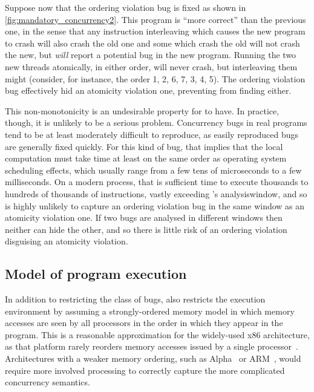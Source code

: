 Suppose now that the ordering violation bug is fixed as shown in
\autoref{fig:mandatory_concurrency2}.  This program is ``more
correct'' than the previous one, in the sense that any instruction
interleaving which causes the new program to crash will also crash the
old one and some which crash the old will not crash the new, but
{\technique} \emph{will} report a potential bug in the new program.
Running the two new threads atomically, in either order, will never
crash, but interleaving them might (consider, for instance, the order
1, 2, 6, 7, 3, 4, 5).  The ordering violation bug effectively hid an
atomicity violation one, preventing {\technique} from finding either.

This non-monotonicity is an undesirable property for {\technique} to
have.  In practice, though, it is unlikely to be a serious problem.
Concurrency bugs in real programs tend to be at least moderately
difficult to reproduce, as easily reproduced bugs are generally fixed
quickly.  For this kind of bug, that implies that the local
computation must take time at least on the same order as operating
system scheduling effects, which usually range from a few tens of
microseconds to a few milliseconds.  On a modern process, that is
sufficient time to execute thousands to hundreds of thousands of
instructions, vastly exceeding {\technique}'s \gls{analysiswindow},
and so {\technique} is highly unlikely to capture an ordering
violation bug in the same window as an atomicity violation one.  If
two bugs are analysed in different windows then neither can hide the
other, and so there is little risk of an ordering violation disguising
an atomicity violation.

\subsection{Model of program execution}

In addition to restricting the class of bugs, {\technique} also
restricts the execution environment by assuming a strongly-ordered
memory model in which memory accesses are seen by all processors in
the order in which they appear in the program.  This is a reasonable
approximation for the widely-used x86 architecture, as that platform
rarely reorders memory accesses issued by a single
processor~\cite[Section 8.2]{Intel2009}.  Architectures with a weaker
memory ordering, such as Alpha~\cite[Section 5.6]{FFFCompaq2002} or
ARM~\cite[Section 5.3.4]{FFFARM2007}, would require more involved
processing to correctly capture the more complicated concurrency
semantics.

